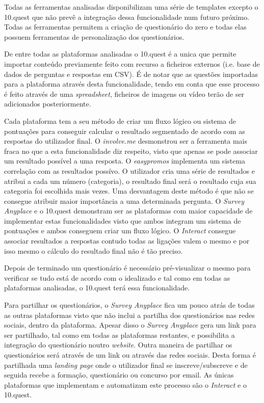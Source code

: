 Todas as ferramentas analisadas disponibilizam uma série de templates excepto o 10.quest que não prevê a integração dessa funcionalidade num futuro próximo. Todas as ferramentas permitem a criação de questionário do zero e todas elas possuem ferramentas de personalização dos questionários.

De entre todas as plataformas analisadas o 10.quest é a unica que permite importar conteúdo previamente feito com recurso a ficheiros externos (i.e. base de dados de perguntas e respostas em CSV). É de notar que as questões importadas para a plataforma através desta funcionalidade, tendo em conta que esse processo é feito através de uma \textit{spreadsheet}, ficheiros de imagens ou vídeo terão de ser adicionados posteriormente.

Cada plataforma tem a seu método de criar um fluxo lógico ou sistema de pontuações para conseguir calcular o resultado segmentado de acordo com as respostas do utilizador final. O \textit{involve.me} desmonstrou ser a ferramenta mais fraca no que a esta funcionalidade diz respeito, visto que apenas se pode associar um resultado possível a uma resposta. O \textit{easypromos} implementa um sistema correlação com as resultados possívo. O utilizador cria uma série de resultados e atribui a cada um número (categoria), o resultado final será o resultado cuja sua categoria foi escolhida mais vezes. Uma desvantagem deste método é que não se consegue atribuir maior importância a uma determinada pergunta. O \textit{Survey Anyplace} e o 10.quest demonstram ser as plataformas com maior capacidade de implementar estas funcionalidades visto que ambos integram um sistema de pontuações e ambos conseguem criar um fluxo lógico. O \textit{Interact} consegue associar resultados a respostas contudo todas as ligações valem o mesmo e por isso mesmo o cálculo do resultado final não é tão preciso.


Depois de terminado um questionário é necessário pré-visualizar o mesmo para verificar se tudo está de acordo com o idealizado e tal como em todas as plataformas analisadas, o 10.quest terá essa funcionalidade.

Para partilhar os questionários, o \textit{Survey Anyplace} fica um pouco atrás de todas as outras plataformas visto que não inclui a partilha dos questionários nas redes sociais, dentro da plataforma. Apesar disso o \textit{Survey Anyplace} gera um link para ser partilhado, tal como em todas as plataformas restantes, e possibilita a integração do questionário noutro \textit{website}. 
Outra maneira de partilhar os questionários será através de um link ou através das redes sociais. Desta forma é partilhada uma \textit{landing page} onde o utilizador final se inscreve/subscreve e de seguida recebe a formação, questionário ou concurso por email. As únicas plataformas que implementam e automatizam este processo são o \textit{Interact} e o 10.quest.


